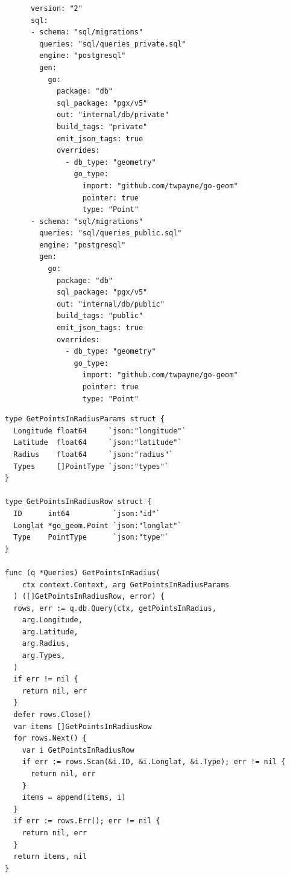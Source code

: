 \begin{listing}[htbp]
  \centering{}
  \begin{minipage}{0.75\textwidth}
  \begin{verbatim}
      version: "2"
      sql:
      - schema: "sql/migrations"
        queries: "sql/queries_private.sql"
        engine: "postgresql"
        gen:
          go:
            package: "db"
            sql_package: "pgx/v5"
            out: "internal/db/private"
            build_tags: "private"
            emit_json_tags: true
            overrides:
              - db_type: "geometry"
                go_type:
                  import: "github.com/twpayne/go-geom"
                  pointer: true
                  type: "Point"
      - schema: "sql/migrations"
        queries: "sql/queries_public.sql"
        engine: "postgresql"
        gen:
          go:
            package: "db"
            sql_package: "pgx/v5"
            out: "internal/db/public"
            build_tags: "public"
            emit_json_tags: true
            overrides:
              - db_type: "geometry"
                go_type:
                  import: "github.com/twpayne/go-geom"
                  pointer: true
                  type: "Point"
  \end{verbatim}
  \end{minipage}
  \caption{An example of a sqlc configuration file with two targets with separate query inputs and type replacement}
  \label{listing:sqlc_config_file}
\end{listing}

\begin{listing}[htbp]
  \centering{}
  \begin{minipage}{0.85\textwidth}
  \begin{verbatim}
type GetPointsInRadiusParams struct {
  Longitude float64     `json:"longitude"`
  Latitude  float64     `json:"latitude"`
  Radius    float64     `json:"radius"`
  Types     []PointType `json:"types"`
}

type GetPointsInRadiusRow struct {
  ID      int64          `json:"id"`
  Longlat *go_geom.Point `json:"longlat"`
  Type    PointType      `json:"type"`
}

func (q *Queries) GetPointsInRadius(
    ctx context.Context, arg GetPointsInRadiusParams
  ) ([]GetPointsInRadiusRow, error) {
  rows, err := q.db.Query(ctx, getPointsInRadius,
    arg.Longitude,
    arg.Latitude,
    arg.Radius,
    arg.Types,
  )
  if err != nil {
    return nil, err
  }
  defer rows.Close()
  var items []GetPointsInRadiusRow
  for rows.Next() {
    var i GetPointsInRadiusRow
    if err := rows.Scan(&i.ID, &i.Longlat, &i.Type); err != nil {
      return nil, err
    }
    items = append(items, i)
  }
  if err := rows.Err(); err != nil {
    return nil, err
  }
  return items, nil
}
  \end{verbatim}
  \end{minipage}
  \caption{An example of a Go binding generated by sqlc from the SQL query in
  Listing \ref{listing:sqlc_query_input}}
  \label{listing:sqlc_generated_bindings}
\end{listing}


